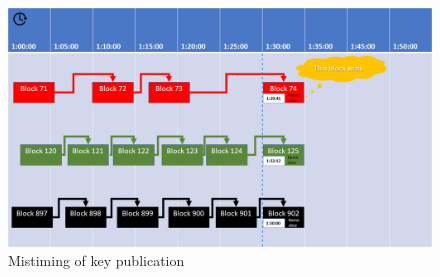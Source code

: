 \begin{figure}[H]
\centering
\includegraphics[scale=1.71]{src/Figures/chap1/chap1-fig05.jpg}
\caption{Mistiming of key publication}\label{chap1-fig05}
\end{figure}

